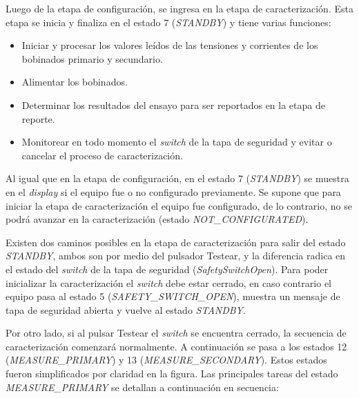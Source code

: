 Luego de la etapa de configuración, se ingresa en la etapa de caracterización. Esta etapa se inicia y finaliza en el estado 7 (\textit{STANDBY}) y tiene varias funciones:

\begin{itemize}
\item Iniciar y procesar los valores leídos de las tensiones y corrientes de los bobinados primario y secundario.
\item Alimentar los bobinados.
\item Determinar los resultados del ensayo para ser reportados en la etapa de reporte.
\item Monitorear en todo momento el \textit{switch} de la tapa de seguridad y evitar o cancelar el proceso de caracterización.
\end{itemize}

Al igual que en la etapa de configuración, en el estado 7 (\textit{STANDBY}) se muestra en el \textit{display} si el equipo fue o no configurado previamente. Se supone que para iniciar la etapa de caracterización el equipo fue configurado, de lo contrario, no se podrá avanzar en la caracterización (estado \textit{NOT\_CONFIGURATED}).

Existen dos caminos posibles en la etapa de caracterización para salir del estado \textit{STANDBY}, ambos son por medio del pulsador Testear, y la diferencia radica en el estado del \textit{switch} de la tapa de seguridad (\textit{SafetySwitchOpen}). Para poder inicializar la caracterización el \textit{switch} debe estar cerrado, en caso contrario el equipo pasa al estado 5 (\textit{SAFETY\_SWITCH\_OPEN}), muestra un mensaje de tapa de seguridad abierta y vuelve al estado \textit{STANDBY}.

Por otro lado, si al pulsar Testear el \textit{switch} se encuentra cerrado, la secuencia de caracterización comenzará normalmente. A continuación se pasa a los estados 12 (\textit{MEASURE\_PRIMARY}) y 13 (\textit{MEASURE\_SECONDARY}). Estos estados fueron simplificados por claridad en la figura. Las principales tareas del estado \textit{MEASURE\_PRIMARY} se detallan a continuación en secuencia:

